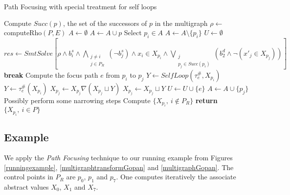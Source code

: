 \documentclass[a4paper,english,titlepage,11pt]{report}
\begin{document}
\begin{algorithm}
\caption{Path Focusing with special treatment for self loops}
\label{pathfocusingoptalgo}
\begin{algorithmic}[1] 
	\State Compute $Succ(p)$, the set of the successors of $p$ in the multigraph
\EndFor
\State $\rho \gets$ computeRho$(P,E)$
\State $A \gets \emptyset$
	\State $A \gets A \cup p$
\EndFor
{}
	\State Select $p_i \in A$
	\State $A \gets A \setminus \{p_i\}$
	\State $U \gets \emptyset$
		\State $res \gets SmtSolve\left[\rho \wedge b_i^s \wedge
		\displaystyle\bigwedge_{\substack{j\neq i \\
		j\in P_R}} (\neg b_j^s) \wedge x_i \in X_{p_i} \wedge
		\bigvee_{\substack{j \\ p_j\in Succ(p_i)}} \left(b_2^d \wedge \neg (x'_j \in
		X_{p_j})\right)\right]$
			\State \textbf{break}
		\EndIf
		\State Compute the focus path $e$ from $p_i$ to $p_j$
			\State $Y \gets SelfLoop(\tau_e^\#,X_{p_i})$
		\Else
			\State $Y \gets \tau_e^\#(X_{p_i})$
		\EndIf
			\State $X_{p_j} \gets X_{p_j} \nabla (X_{p_j} \sqcup Y)$
		\Else
			\State $X_{p_j} \gets X_{p_j} \sqcup Y$
			\State $U \gets U \cup \{e\}$
		\EndIf
		\State $A \gets A \cup \{p_j\}$
	\EndWhile
\EndWhile
\State Possibly perform some narrowing steps
\State Compute $\{X_{p_i},\ i \notin P_R\}$
\State \textbf{return} $\{X_{p_i},\ i \in P\}$
\EndProcedure
\end{algorithmic}
\end{algorithm}
	
	\subsection{Example}

	We apply the \emph{Path Focusing} technique to our running example from
	Figures \ref{runningexample}, \ref{multigraphtransformGopan} and
	\ref{multigraphGopan}.
	The control points in $P_R$ are $p_0$, $p_1$ and $p_7$. One computes
	iteratively the associate abstract values $X_0$, $X_1$ and $X_7$.
\end{document}
